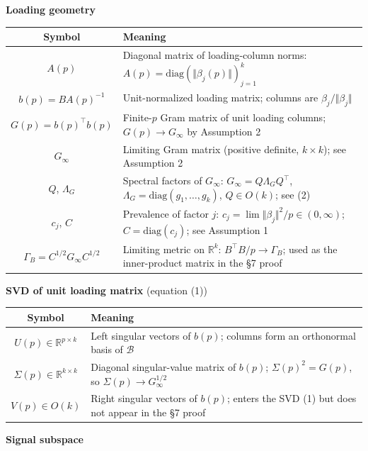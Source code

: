 \documentclass{article}
\theoremstyle{remark}
\begin{document}
\textbf{Loading geometry}

\begin{center}
\begin{tabular}{|c|l|}
\hline
Symbol & Meaning \\
\hline
$A(p)$ & Diagonal matrix of loading-column norms: $A(p) = \mathrm{diag}(\Vert \beta_j(p)\Vert )_{j=1}^k$ \\
\hline
$b(p) = BA(p)^{-1}$ & Unit-normalized loading matrix; columns are $\beta_j/\Vert \beta_j\Vert $ \\
\hline
$G(p) = b(p)^\top b(p)$ & Finite-$p$ Gram matrix of unit loading columns; $G(p) \to G_\infty$ by Assumption 2 \\
\hline
$G_\infty$ & Limiting Gram matrix (positive definite, $k\times k$); see Assumption 2 \\
\hline
$Q$, $\Lambda_G$ & Spectral factors of $G_\infty$: $G_\infty = Q\Lambda_G Q^\top$, $\Lambda_G = \mathrm{diag}(g_1,\ldots,g_k)$, $Q\in O(k)$; see (2) \\
\hline
$c_j$, $C$ & Prevalence of factor $j$: $c_j = \lim\Vert \beta_j\Vert^2/p \in (0,\infty)$; $C = \mathrm{diag}(c_j)$; see Assumption 1 \\
\hline
$\Gamma_B = C^{1/2}G_\infty C^{1/2}$ & Limiting metric on $\mathbb{R}^k$: $B^\top B/p \to \Gamma_B$; used as the inner-product matrix in the §7 proof \\
\hline
\end{tabular}
\end{center}

\textbf{SVD of unit loading matrix} (equation (1))

\begin{center}
\begin{tabular}{|c|l|}
\hline
Symbol & Meaning \\
\hline
$U(p) \in \mathbb{R}^{p\times k}$ & Left singular vectors of $b(p)$; columns form an orthonormal basis of $\mathcal{B}$ \\
\hline
$\Sigma(p) \in \mathbb{R}^{k\times k}$ & Diagonal singular-value matrix of $b(p)$; $\Sigma(p)^2 = G(p)$, so $\Sigma(p)\to G_\infty^{1/2}$ \\
\hline
$V(p) \in O(k)$ & Right singular vectors of $b(p)$; enters the SVD (1) but does not appear in the §7 proof \\
\hline
\end{tabular}
\end{center}

\textbf{Signal subspace}
\end{document}

